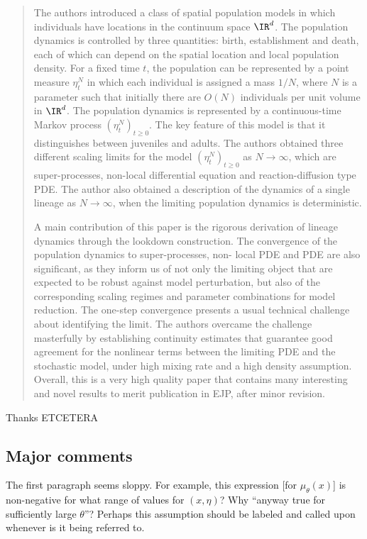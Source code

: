 \begin{quote}
The authors introduced a class of spatial population models in which individuals have locations
in the continuum space $\IR^d$. The population dynamics is controlled by three quantities: birth,
establishment and death, each of which can depend on the spatial location and local population
density. For a fixed time $t$, the population can be represented by a point measure $\eta_t^N$ in which
each individual is assigned a mass $1/N$, where $N$ is a parameter such that initially there are $O(N)$
individuals per unit volume in $\IR^d$. The population dynamics is represented by a continuous-time
Markov process $(\eta_t^N)_{t\ge0}$. The key feature of this model is that it distinguishes between juveniles
and adults. The authors obtained three different scaling limits for the model $(\eta_t^N)_{t\ge0}$ as $N \to \infty$,
which are super-processes, non-local differential equation and reaction-diffusion type PDE. The
author also obtained a description of the dynamics of a single lineage as $N \to \infty$, when the
limiting population dynamics is deterministic.

A main contribution of this paper is the rigorous derivation of lineage dynamics through the
lookdown construction. The convergence of the population dynamics to super-processes, non-
local PDE and PDE are also significant, as they inform us of not only the limiting object that are
expected to be robust against model perturbation, but also of the corresponding scaling regimes
and parameter combinations for model reduction. The one-step convergence presents a usual technical
challenge about identifying the limit. The authors overcame the challenge masterfully by
establishing continuity estimates that guarantee good agreement for the nonlinear terms between
the limiting PDE and the stochastic model, under high mixing rate and a high density assumption.
Overall, this is a very high quality paper that contains many interesting and novel results to merit
publication in EJP, after minor revision.
\end{quote}

Thanks ETCETERA

\subsection*{Major comments}

\begin{point}{\revref}
The first paragraph seems sloppy. For example, this expression [for $\mu_\theta(x)$] is non-negative for
what range of values for $(x, \eta)$? Why ``anyway true for sufficiently large $\theta$''? Perhaps this
assumption should be labeled and called upon whenever is it being referred to.
\end{point}


